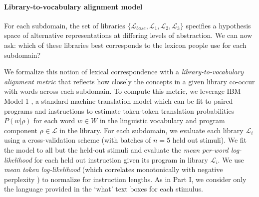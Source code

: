 \documentclass[10pt,letterpaper]{article}
\begin{document}


\paragraph{Library-to-vocabulary alignment model}
For each subdomain, the set of libraries $\{\mathcal{L}_{base}, \mathcal{L}_1, \mathcal{L}_2, \mathcal{L}_3\}$ specifies a hypothesis space of alternative representations at differing levels of abstraction. We can now ask: which of these libraries best corresponds to the lexicon people use for each subdomain?


We formalize this notion of lexical correspondence with a \textit{library-to-vocabulary alignment metric} that reflects how closely the concepts in a given library co-occur with words across each subdomain. 
To compute this metric, we leverage IBM Model 1 , a standard machine translation model which can be fit to paired programs and instructions to estimate token-token translation probabilities $P(w|\rho)$ for each word $w \in W$ in the linguistic vocabulary and program component $\rho \in \mathcal{L}$ in the library. 
For each subdomain, we evaluate each library $\mathcal{L}_i$ using a cross-validation scheme (with batches of $n=5$ held out stimuli). 
We fit the model to all but the held-out stimuli and evaluate the \textit{mean per-word log-likelihood} for each held out instruction given its program in library $\mathcal{L}_i$. 
We use \textit{mean token log-likelihood} (which correlates monotonically with negative {perplexity} ) to normalize for instruction lengths. As in Part I, we consider only the language provided in the `what' text boxes for each stimulus.
\end{document}
